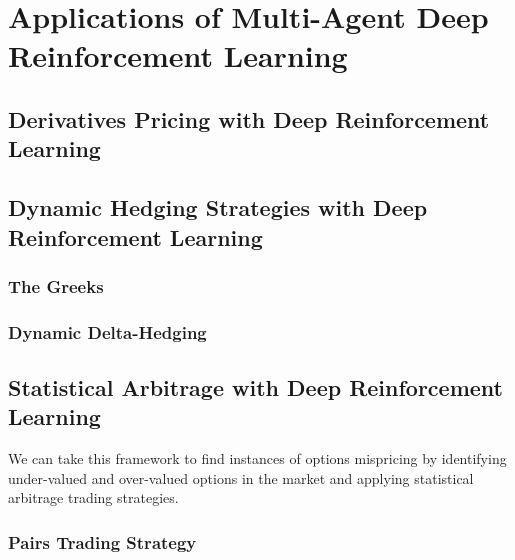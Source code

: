 \chapter{Applications of Multi-Agent Deep Reinforcement Learning}

\section{Derivatives Pricing with Deep Reinforcement Learning}

\section{Dynamic Hedging Strategies with Deep Reinforcement Learning}

\subsection{The Greeks}

\subsection{Dynamic Delta-Hedging}

\section{Statistical Arbitrage with Deep Reinforcement Learning}

We can take this framework to find instances of options mispricing by identifying under-valued and over-valued options in the market and applying statistical arbitrage trading strategies.

\subsection{Pairs Trading Strategy}

